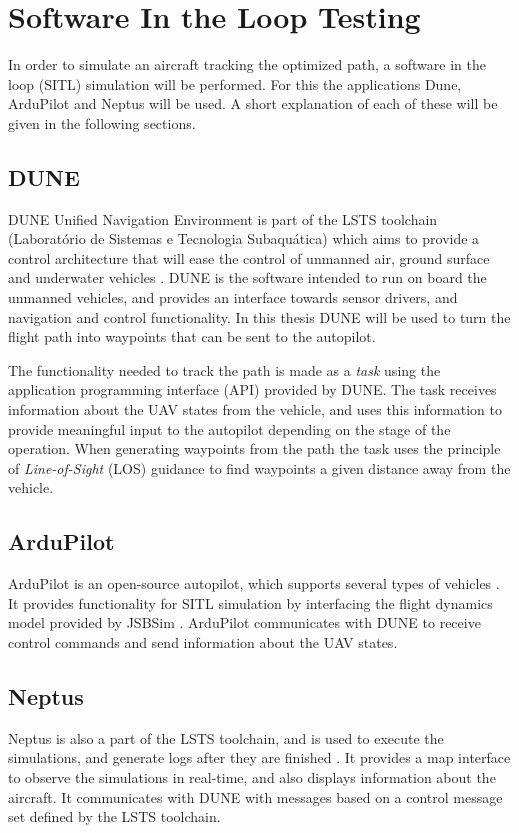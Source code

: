 \section{Software In the Loop Testing}

In order to simulate an aircraft tracking the optimized path, a software in the loop (SITL) simulation will be performed. For this the applications Dune, ArduPilot and Neptus will be used. A short explanation of each of these will be given in the following sections.


\subsection{DUNE}

DUNE Unified Navigation Environment is part of the LSTS toolchain (Laboratório de Sistemas e Tecnologia Subaquática) which aims to provide a control architecture that will ease the control of unmanned air, ground surface and underwater vehicles \cite{DUNE}. DUNE is the software intended to run on board the unmanned vehicles, and provides an interface towards sensor drivers, and navigation and control functionality. In this thesis DUNE will be used to turn the flight path into waypoints that can be sent to the autopilot.

The functionality needed to track the path is made as a \textit{task} using the application programming interface (API) provided by DUNE. The task receives information about the UAV states from the vehicle, and uses this information to provide meaningful input to the autopilot depending on the stage of the operation. When generating waypoints from the path the task uses the principle of \textit{Line-of-Sight} (LOS) guidance to find waypoints a given distance away from the vehicle.


\subsection{ArduPilot}

ArduPilot is an open-source autopilot, which supports several types of vehicles \cite{ARDUPILOT}. It provides functionality for SITL simulation by interfacing the flight dynamics model provided by JSBSim \cite{JSBSim}. ArduPilot communicates with DUNE to receive control commands and send information about the UAV states.


\subsection{Neptus}

Neptus is also a part of the LSTS toolchain, and is used to execute the simulations, and generate logs after they are finished \cite{NEPTUS}. It provides a map interface to observe the simulations in real-time, and also displays information about the aircraft. It communicates with DUNE with messages based on a control message set defined by the LSTS toolchain.